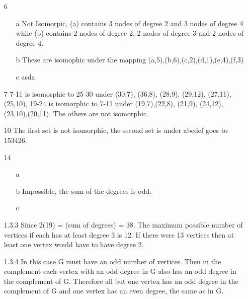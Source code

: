 \documentclass{article}
\begin{document}
\begin{enumerate}
\item[6]
\begin{enumerate}
  \item[a] Not Isomorpic, (a) contains 3 nodes of degree 2 and 3 nodes of degree
  4 while (b) contains 2 nodes of degree 2, 2 nodes of degree 3 and 2 nodes of
  degree 4. 
  \item[b] These are isomophic under the mapping
  (a,5),(b,6),(c,2),(d,1),(e,4),(f,3)
  \item[c] 
  asda
\end{enumerate}
\item[7]
7-11 is isomorphic to 25-30 under (30,7), (36,8), (28,9), (29,12), (27,11),
(25,10), 19-24 is isomorphic to 7-11 under (19,7),(22,8), (21,9),
(24,12),(23,10),(20,11). The others are not isomorphic. 
\item[10]
The first set is not isomorphic, the second set is under abcdef goes to 153426. 
\item[14] 
\begin{enumerate}
  \item[a]
  	
  \item[b]
  Impossible, the sum of the degrees is odd. 
  \item[c]
\end{enumerate}
\item[1.3.3]
Since 2(19) = (sum of degrees) = 38. The maximum possible number of vertices if each has at least degree 3 is 12. If there were 13 vertices then at least one vertex would have to have degree 2.
\item[1.3.4]
In this case G must have an odd number of vertices. Then in the complement each vertex with an odd degree in G also has an odd degree in the complement of G. Therefore all but one vertex has an odd degree in the complement of G and one vertex has an even degree, the same as in G. 


\end{enumerate}
\end{document}
